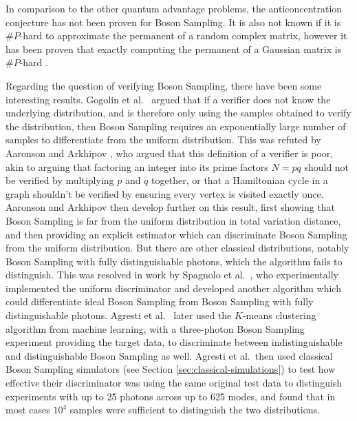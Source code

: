 In comparison to the other quantum advantage problems, the anticoncentration conjecture has not been proven for Boson Sampling. It is also not known if it is $\#P$-hard to approximate the permanent of a random complex matrix, however it has been proven that exactly computing the permanent of a Gaussian matrix is $\#P$-hard \cite{aaronson2011}.

Regarding the question of verifying Boson Sampling, there have been some interesting results. Gogolin et al.~\cite{gogolin2013} argued that if a verifier does not know the underlying distribution, and is therefore only using the samples obtained to verify the distribution, then Boson Sampling requires an exponentially large number of samples to differentiate from the uniform distribution. This was refuted by Aaronson and Arkhipov \cite{aaronson2014}, who argued that this definition of a verifier is poor, akin to arguing that factoring an integer into its prime factors $N=pq$ should not be verified by multiplying $p$ and $q$ together, or that a Hamiltonian cycle in a graph shouldn't be verified by ensuring every vertex is visited exactly once. Aaronson and Arkhipov then develop further on this result, first showing that Boson Sampling is far from the uniform distribution in total variation distance, and then providing an explicit estimator which can discriminate Boson Sampling from the uniform distribution. But there are other classical distributions, notably Boson Sampling with fully distinguishable photons, which the algorithm fails to distinguish. This was resolved in work by Spagnolo et al.~\cite{spagnolo2014}, who experimentally implemented the uniform discriminator and developed another algorithm which could differentiate ideal Boson Sampling from Boson Sampling with fully distinguishable photons. Agresti et al.~\cite{agresti2019} later used the $K$-means clustering algorithm from machine learning, with a three-photon Boson Sampling experiment providing the target data, to discriminate between indistinguishable and distinguishable Boson Sampling as well. Agresti et al.\ then used classical Boson Sampling simulators (see Section \ref{sec:classical-simulations}) to test how effective their discriminator was using the same original test data to distinguish experiments with up to 25 photons across up to 625 modes, and found that in most cases $10^4$ samples were sufficient to distinguish the two distributions.

